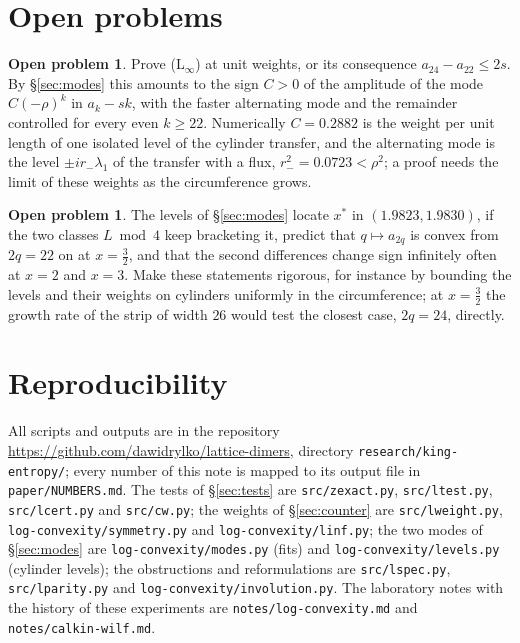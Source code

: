 \documentclass[11pt]{amsart}
\theoremstyle{definition}
\newtheorem{problem}[theorem]{Open problem}
\theoremstyle{remark}
\newcommand{\file}[1]{\texttt{#1}}
\begin{document}
\section{Open problems}

\begin{problem}
Prove (L$_\infty$) at unit weights, or its consequence $a_{24} - a_{22} \le 2s$. By
\S\ref{sec:modes} this amounts to the sign $C > 0$ of the amplitude of the mode $C(-\rho)^k$ in
$a_k - sk$, with the faster alternating mode and the remainder controlled for every even $k \ge 22$.
Numerically $C = 0.2882$ is the weight per unit length of one isolated level of the cylinder
transfer, and the alternating mode is the level $\pm i r_-\lambda_1$ of the transfer with a flux,
$r_-^2 = 0.0723 < \rho^2$; a proof needs the limit of these weights as the circumference grows.
\end{problem}

\begin{problem}
The levels of \S\ref{sec:modes} locate $x^*$ in $(1.9823, 1.9830)$, if the two classes $L \bmod 4$
keep bracketing it, predict that $q \mapsto a_{2q}$
is convex from $2q = 22$ on at $x = \frac32$, and that the second differences change sign
infinitely often at $x = 2$ and $x = 3$. Make these statements rigorous, for instance by bounding the
levels and their weights on cylinders uniformly in the circumference; at $x = \frac32$ the growth
rate of the strip of width $26$ would test the closest case, $2q = 24$, directly.
\end{problem}

\section*{Reproducibility}
{\sloppy All scripts and outputs are in the repository \url{https://github.com/dawidrylko/lattice-dimers},
directory \texttt{research/king-entropy/}; every number of this note is mapped to its output file in
\file{paper/NUMBERS.md}. The tests of \S\ref{sec:tests} are \file{src/zexact.py},
\file{src/ltest.py}, \file{src/lcert.py} and \file{src/cw.py}; the weights of \S\ref{sec:counter}
are \file{src/lweight.py}, \file{log-convexity/symmetry.py} and \file{log-convexity/linf.py}; the two modes of
\S\ref{sec:modes} are \file{log-convexity/modes.py} (fits) and \file{log-convexity/levels.py} (cylinder
levels); the obstructions and reformulations are
\file{src/lspec.py}, \file{src/lparity.py} and \file{log-convexity/involution.py}. The laboratory notes with the
history of these experiments are \file{notes/log-convexity.md} and \file{notes/calkin-wilf.md}.\par}
\end{document}
